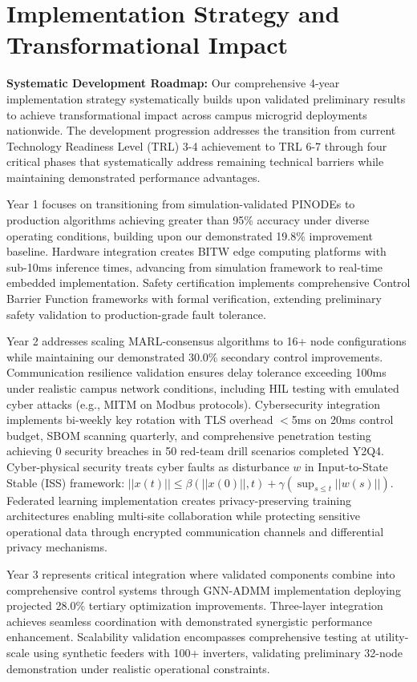 \documentclass[12pt]{article}
\begin{document}
\section{Implementation Strategy and Transformational Impact}

\textbf{Systematic Development Roadmap:} Our comprehensive 4-year implementation strategy systematically builds upon validated preliminary results to achieve transformational impact across campus microgrid deployments nationwide. The development progression addresses the transition from current Technology Readiness Level (TRL) 3-4 achievement to TRL 6-7 through four critical phases that systematically address remaining technical barriers while maintaining demonstrated performance advantages.

Year 1 focuses on transitioning from simulation-validated PINODEs to production algorithms achieving greater than 95\% accuracy under diverse operating conditions, building upon our demonstrated 19.8\% improvement baseline. Hardware integration creates BITW edge computing platforms with sub-10ms inference times, advancing from simulation framework to real-time embedded implementation. Safety certification implements comprehensive Control Barrier Function frameworks with formal verification, extending preliminary safety validation to production-grade fault tolerance.

Year 2 addresses scaling MARL-consensus algorithms to 16+ node configurations while maintaining our demonstrated 30.0\% secondary control improvements. Communication resilience validation ensures delay tolerance exceeding 100ms under realistic campus network conditions, including HIL testing with emulated cyber attacks (e.g., MITM on Modbus protocols). Cybersecurity integration implements bi-weekly key rotation with TLS overhead $<$5ms on 20ms control budget, SBOM scanning quarterly, and comprehensive penetration testing achieving 0 security breaches in 50 red-team drill scenarios completed Y2Q4. Cyber-physical security treats cyber faults as disturbance $w$ in Input-to-State Stable (ISS) framework: $||x(t)|| \leq \beta(||x(0)||, t) + \gamma(\sup_{s \leq t} ||w(s)||)$. Federated learning implementation creates privacy-preserving training architectures enabling multi-site collaboration while protecting sensitive operational data through encrypted communication channels and differential privacy mechanisms.

Year 3 represents critical integration where validated components combine into comprehensive control systems through GNN-ADMM implementation deploying projected 28.0\% tertiary optimization improvements. Three-layer integration achieves seamless coordination with demonstrated synergistic performance enhancement. Scalability validation encompasses comprehensive testing at utility-scale using synthetic feeders with 100+ inverters, validating preliminary 32-node demonstration under realistic operational constraints.
\end{document}
